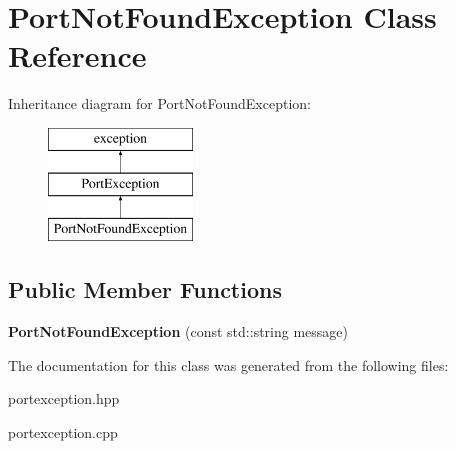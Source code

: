 \hypertarget{class_port_not_found_exception}{}\section{Port\+Not\+Found\+Exception Class Reference}
\label{class_port_not_found_exception}
Inheritance diagram for Port\+Not\+Found\+Exception\+:\begin{figure}[H]
\begin{center}
\leavevmode
\includegraphics[height=3.000000cm]{class_port_not_found_exception}
\end{center}
\end{figure}
\subsection*{Public Member Functions}
\begin{DoxyCompactItemize}
\item 
\hypertarget{class_port_not_found_exception_a2b233cfee5fc9eb16817e405107f95cd}{}{\bfseries Port\+Not\+Found\+Exception} (const std\+::string message)\label{class_port_not_found_exception_a2b233cfee5fc9eb16817e405107f95cd}

\end{DoxyCompactItemize}


The documentation for this class was generated from the following files\+:\begin{DoxyCompactItemize}
\item 
portexception.\+hpp\item 
portexception.\+cpp\end{DoxyCompactItemize}
